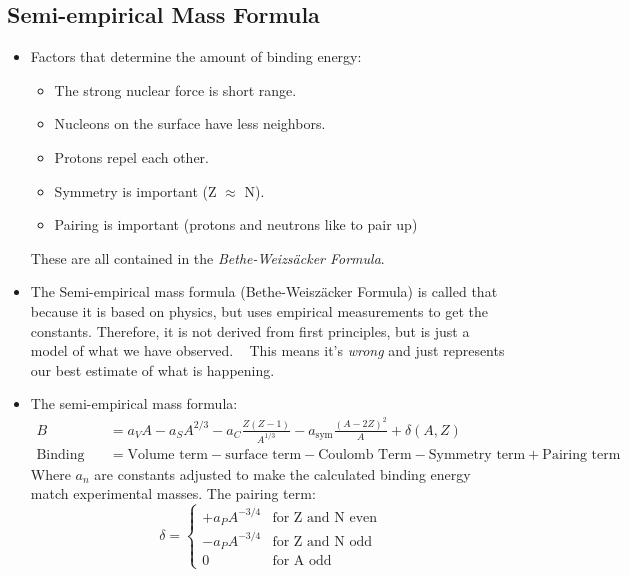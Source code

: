 \documentclass[letter]{article}
\begin{document}
\subsection{Semi-empirical Mass Formula}
\begin{itemize}
\item Factors that determine the amount of binding energy:
  \begin{itemize}
  \item The strong nuclear force is short range.
  \item Nucleons on the surface have less neighbors.
  \item Protons repel each other.
  \item Symmetry is important (Z $\approx$ N).
  \item Pairing is important (protons and neutrons like to pair up)
  \end{itemize}
These are all contained in the \textit{Bethe-Weizs\"acker
  Formula}.~\cite[Lec 3]{lecture}
\item The Semi-empirical mass formula (Bethe-Weisz\"acker Formula) is
  called that because it is based on physics, but uses empirical
  measurements to get the constants. Therefore, it is not derived from
  first principles, but is just a model of what we have
  observed. ~\cite[Lec 3]{krane} This means it's \textit{wrong} and
  just represents our best estimate of what is happening.
\item The semi-empirical mass formula:
  \begin{equation*}
    \begin{split}
      B &= a_VA-
      a_SA^{2/3}-a_C\frac{Z(Z-1)}{A^{1/3}}-a_{\text{sym}}\frac{{(A-2Z)}^2}{A}
      + \delta{}(A,Z) \\
      \text{Binding Energy} &=  \text{Volume term} -  \text{surface
        term} -  \text{Coulomb Term} -  \text{Symmetry term} +
      \text{Pairing term}
    \end{split}
  \end{equation*}
Where $a_n$ are constants adjusted to make the calculated binding
energy match experimental masses. The pairing term:
\begin{equation*}
  \delta = 
  \begin{cases}
    +a_PA^{-3/4} & \text{for Z and N even} \\
    -a_PA^{-3/4} & \text{for Z and N odd} \\
    0 & \text{for A odd}
  \end{cases}
\end{equation*}


\end{itemize}
\end{document}
